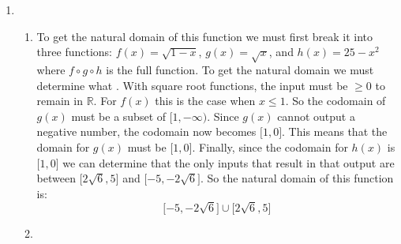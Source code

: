 \documentclass{article}
\begin{document}
    \begin{enumerate}
            \item \begin{enumerate}
                    \item To get the natural domain of this function we must first break it into three functions: $f(x)=\sqrt{1-x}$, $g(x)=\sqrt{x}$, and $h(x)=25-x^{2}$ where $f \circ g \circ h$ is the full function. To get the natural domain we must determine what . With square root functions, the input must be $\geq 0$ to remain in $\mathbb{R}$. For $f(x)$ this is the case when $x \leq 1$. So the codomain of $g(x)$ must be a subset of $\lbrack 1,-\infty)$. Since $g(x)$ cannot output a negative number, the codomain now becomes $\lbrack 1,0 \rbrack$. This means that the domain for $g(x)$ must be $\lbrack 1,0 \rbrack$. Finally, since the codomain for $h(x)$ is $\lbrack 1,0 \rbrack$ we can determine that the only inputs that result in that output are between $\lbrack 2\sqrt{6}, 5 \rbrack$ and $\lbrack -5, -2\sqrt{6} \rbrack$. So the natural domain of this function is:
                          \[\lbrack -5, -2\sqrt{6} \rbrack \cup \lbrack 2\sqrt{6}, 5 \rbrack\]
                    \item
            \end{enumerate}
    \end{enumerate}
\end{document}
